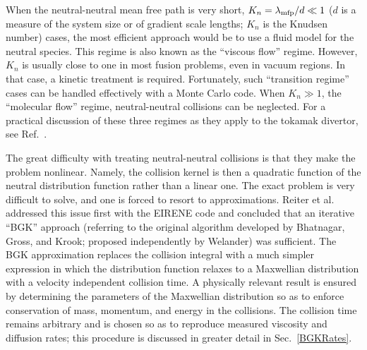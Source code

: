 \documentclass[12pt]{report}
\begin{document}
When the neutral-neutral mean free path is very short, 
$K_{n} = \lambda_{\rm mfp} / d \ll 1$ ($d$ is a measure of the 
system size or of gradient scale lengths; $K_{n}$ is the 
Knudsen number) cases, 
the most efficient approach would be to use a fluid model
for the neutral species. This regime is also known as the ``viscous
flow'' regime\cite{OHan89}. However, $K_{n}$ is usually close to one in most
fusion problems, even in vacuum regions. In that case, a kinetic
treatment is required. Fortunately, such ``transition regime'' cases
can be handled effectively with a Monte Carlo code. When $K_{n} \gg 1$,
the ``molecular flow'' regime, neutral-neutral collisions can be
neglected. For a practical discussion
of these three regimes as they apply to the tokamak divertor, see
Ref.~\cite{Niem95}.

The great difficulty with treating neutral-neutral collisions is that they
make the problem nonlinear.  Namely, the collision kernel is then a 
quadratic function of the neutral distribution function rather than a 
linear one. The exact problem is very difficult to solve, and one is
forced to resort to approximations. Reiter et al. addressed this issue
first with the EIRENE code and concluded that an iterative ``BGK'' approach
(referring to the original algorithm developed by Bhatnagar,
Gross, and Krook\cite{Bhat54}; proposed independently by 
Welander\cite{Wela54}) was sufficient\cite{Mayxx,Reit97}. The BGK
approximation replaces the collision integral with a much simpler 
expression in which the distribution function relaxes to a Maxwellian
distribution
with a velocity independent collision time. A physically relevant result
is ensured by determining the parameters of the Maxwellian distribution so as
to enforce conservation of mass, momentum, and energy in the collisions.
The collision time remains arbitrary and is chosen so as to reproduce
measured viscosity and diffusion rates; this procedure is discussed in
greater detail in Sec.~\ref{BGKRates}.
\end{document}
